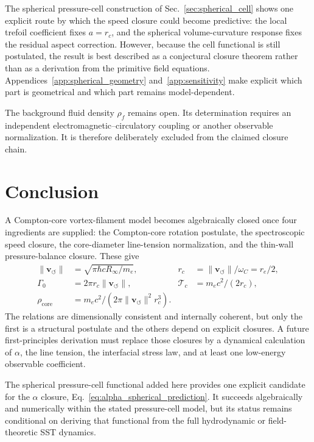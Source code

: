 \documentclass[aps,pra,preprint,longbibliography,nofootinbib]{revtex4-2}
\newcommand{\vnorm}{\lVert\mathbf{v}_{\!\boldsymbol{\circlearrowleft}}\rVert} %
\newcommand{\rhof}{\rho_{\!f}}                   %
\newcommand{\rhocore}{\rho_{\mathrm{core}}}      %
\newcommand{\rc}{r_c}                            %
\newcommand{\Tc}{\mathcal{T}_c}                  %
\newcommand{\Gz}{\Gamma_0}                       %
\begin{document}
The spherical pressure-cell construction of Sec.~\ref{sec:spherical_cell}
shows one explicit route by which the speed closure could become
predictive: the local trefoil coefficient fixes $a=r_c$, and the
spherical volume-curvature response fixes the residual aspect correction.
However, because the cell functional is still postulated, the result is
best described as a conjectural closure theorem rather than as a derivation
from the primitive field equations.  Appendices~\ref{app:spherical_geometry}
and~\ref{app:sensitivity} make explicit which part is geometrical and which
part remains model-dependent.

The background fluid density $\rhof$ remains open.  Its determination
requires an independent electromagnetic--circulatory coupling or another
observable normalization.  It is therefore deliberately excluded from
the claimed closure chain.

\section{Conclusion}
\label{sec:conclusion}

A Compton-core vortex-filament model becomes algebraically closed once
four ingredients are supplied: the Compton-core rotation postulate, the
spectroscopic speed closure, the core-diameter line-tension
normalization, and the thin-wall pressure-balance closure.  These give
\begin{align*}
  \vnorm  &= \sqrt{\pi\hbar cR_\infty/m_e},
  &\rc    &= \vnorm/\omega_C = r_e/2, \\
  \Gz     &= 2\pi\rc\vnorm,
  &\Tc    &= m_ec^2/(2\rc),\\
  \rhocore &= m_ec^2/(2\pi\vnorm^2\rc^3).
\end{align*}
The relations are dimensionally consistent and internally coherent, but
only the first is a structural postulate and the others depend on
explicit closures.  A future first-principles derivation must replace
those closures by a dynamical calculation of $\alpha$, the line tension,
the interfacial stress law, and at least one low-energy observable
coefficient.


The spherical pressure-cell functional added here provides one explicit
candidate for the $\alpha$ closure,
Eq.~\eqref{eq:alpha_spherical_prediction}.  It succeeds algebraically and
numerically within the stated pressure-cell model, but its status remains
conditional on deriving that functional from the full hydrodynamic or
field-theoretic SST dynamics.
\end{document}
